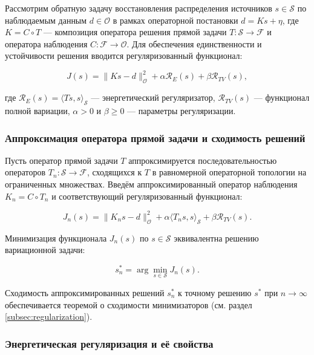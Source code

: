 \documentclass[sn-mathphys-num]{bst/sn-jnl}
\theoremstyle{thmstylethree}
\theoremstyle{thmstyletwo}
\theoremstyle{thmstyleone}
\begin{document}
Рассмотрим обратную задачу восстановления распределения источников $s \in \mathcal{S}$ по наблюдаемым данным $d \in \mathcal{O}$ в рамках операторной постановки $d = Ks + \eta$, где $K = C \circ T$ --- композиция оператора решения прямой задачи $T: \mathcal{S} \to \mathcal{F}$ и оператора наблюдения $C: \mathcal{F} \to \mathcal{O}$. Для обеспечения единственности и устойчивости решения вводится регуляризованный функционал:

\begin{equation}
    J(s) = \|Ks - d\|_{\mathcal{O}}^2 + \alpha \mathcal{R}_E(s) + \beta \mathcal{R}_{TV}(s),
\end{equation}

где $\mathcal{R}_E(s) = \langle Ts, s \rangle_{\mathcal{S}}$ --- энергетический регуляризатор, $\mathcal{R}_{TV}(s)$ --- функционал полной вариации, $\alpha > 0$ и $\beta \geq 0$ --- параметры регуляризации.

\subsubsection{Аппроксимация оператора прямой задачи и сходимость решений}

Пусть оператор прямой задачи $T$ аппроксимируется последовательностью операторов $T_n: \mathcal{S} \to \mathcal{F}$, сходящихся к $T$ в равномерной операторной топологии на ограниченных множествах. Введём аппроксимированный оператор наблюдения $K_n = C \circ T_n$ и соответствующий регуляризованный функционал:

\begin{equation}
    J_n(s) = \|K_n s - d\|_{\mathcal{O}}^2 + \alpha \langle T_n s, s \rangle_{\mathcal{S}} + \beta \mathcal{R}_{TV}(s).
\end{equation}

Минимизация функционала $J_n(s)$ по $s \in \mathcal{S}$ эквивалентна решению вариационной задачи:

\begin{equation}
    s_n^* = \arg\min_{s \in \mathcal{S}} J_n(s).
\end{equation}

Сходимость аппроксимированных решений $s_n^*$ к точному решению $s^*$ при $n \to \infty$ обеспечивается теоремой о сходимости минимизаторов (см. раздел \ref{subsec:regularization}).

\subsubsection{Энергетическая регуляризация и её свойства}
\end{document}
